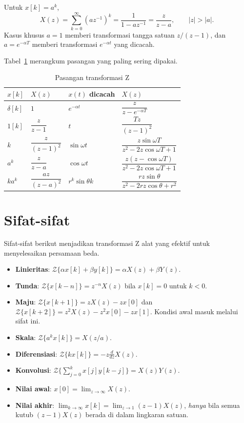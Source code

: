 \begin{contoh}
	Untuk $x[k] = a^k$,
	\[
		X(z) = \sum_{k=0}^{\infty}(az^{-1})^k = \frac{1}{1-az^{-1}} = \frac{z}{z-a},\qquad |z| > |a|.
	\]
	Kasus khusus $a = 1$ memberi transformasi tangga satuan $z/(z-1)$, dan $a = e^{-\alpha T}$ memberi transformasi $e^{-\alpha t}$ yang dicacah.
\end{contoh}

Tabel~\ref{tab:b3-z} merangkum pasangan yang paling sering dipakai.

\begin{table}[H]
	\centering
	\caption{Pasangan transformasi Z}
	\label{tab:b3-z}
	\renewcommand{\arraystretch}{2.1}
	\begin{tabular}{@{}l l @{\qquad} l l@{}}
		\toprule
		$x[k]$ & $X(z)$ & $x(t)$ dicacah & $X(z)$ \\
		\midrule
		$\delta[k]$ & $1$ & $e^{-\alpha t}$ & $\dfrac{z}{z-e^{-\alpha T}}$ \\
		$1[k]$ & $\dfrac{z}{z-1}$ & $t$ & $\dfrac{Tz}{(z-1)^2}$ \\
		$k$ & $\dfrac{z}{(z-1)^2}$ & $\sin\omega t$ & $\dfrac{z\sin\omega T}{z^2-2z\cos\omega T+1}$ \\
		$a^k$ & $\dfrac{z}{z-a}$ & $\cos\omega t$ & $\dfrac{z(z-\cos\omega T)}{z^2-2z\cos\omega T+1}$ \\
		$ka^k$ & $\dfrac{az}{(z-a)^2}$ & $r^k\sin\theta k$ & $\dfrac{rz\sin\theta}{z^2-2rz\cos\theta+r^2}$ \\
		\bottomrule
	\end{tabular}
\end{table}

\section{Sifat-sifat}
Sifat-sifat berikut menjadikan transformasi Z alat yang efektif untuk menyelesaikan persamaan beda.
\begin{itemize}
	\item \textbf{Linieritas}: $\mathcal{Z}\{\alpha x[k] + \beta y[k]\} = \alpha X(z) + \beta Y(z)$.
	\item \textbf{Tunda}: $\mathcal{Z}\{x[k-n]\} = z^{-n}X(z)$ bila $x[k] = 0$ untuk $k < 0$.
	\item \textbf{Maju}: $\mathcal{Z}\{x[k+1]\} = zX(z) - zx[0]$ dan $\mathcal{Z}\{x[k+2]\} = z^2X(z) - z^2x[0] - zx[1]$. Kondisi awal masuk melalui sifat ini.
	\item \textbf{Skala}: $\mathcal{Z}\{a^kx[k]\} = X(z/a)$.
	\item \textbf{Diferensiasi}: $\mathcal{Z}\{kx[k]\} = -z\frac{d}{dz}X(z)$.
	\item \textbf{Konvolusi}: $\mathcal{Z}\big\{\sum_{j=0}^{k}x[j]y[k-j]\big\} = X(z)Y(z)$.
	\item \textbf{Nilai awal}: $x[0] = \lim_{z\to\infty}X(z)$.
	\item \textbf{Nilai akhir}: $\lim_{k\to\infty}x[k] = \lim_{z\to1}(z-1)X(z)$, \emph{hanya} bila semua kutub $(z-1)X(z)$ berada di dalam lingkaran satuan.
\end{itemize}

